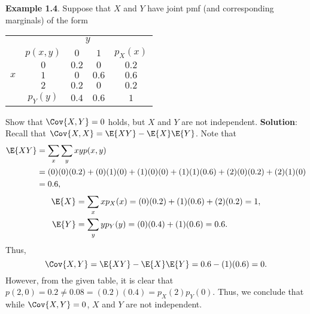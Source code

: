 \begin{Example}
    \textbf{Example 1.4}. Suppose that $ X $ and $ Y $ have joint pmf (and corresponding marginals) of the form
    \begin{center}
        \begin{NiceTabular}{cc|cc|c}
               &  &                                                                               \\
             &    & $ 0 $               & $ 1 $ &                                 \\
             & $ 0 $              & $ 0.2 $                     & $ 0 $                       & $ 0.2 $                   \\
            & $ 1 $            & $ 0 $                     & $ 0.6 $                       & $ 0.6 $                   \\
            & $ 2 $            & $ 0.2 $                     & $ 0 $                       & $ 0.2 $                   \\
               &                   &  &  & 
        \end{NiceTabular}
    \end{center}
    Show that $ \Cov{X,Y}=0 $ holds, but $ X $ and $ Y $ are not independent.
    \tcblower{}
    \textbf{Solution}: Recall that $ \Cov{X,X}=\E{XY}-\E{X}\E{Y} $. Note that
    \begin{align*}
        \E{XY}
         & =\sum_x\sum_y xyp(x,y)                                             \\
         & =(0)(0)(0.2)+(0)(1)(0)+(1)(0)(0)+(1)(1)(0.6)+(2)(0)(0.2)+(2)(1)(0) \\
         & =0.6,
    \end{align*}
    \begin{align*}
        \E{X} & =\sum_x x p_X(x)=(0)(0.2)+(1)(0.6)+(2)(0.2)=1, \\
        \E{Y} & =\sum_y y p_Y(y)=(0)(0.4)+(1)(0.6)=0.6.
    \end{align*}
    Thus,
    \[ \Cov{X,Y}=\E{XY}-\E{X}\E{Y}=0.6-(1)(0.6)=0. \]
    However, from the given table, it is clear that $ p(2,0)=0.2\ne 0.08=(0.2)(0.4)=p_X(2)p_Y(0) $. Thus, we
    conclude that while $ \Cov{X,Y}=0 $, $ X $ and $ Y $ are not independent.
\end{Example}
